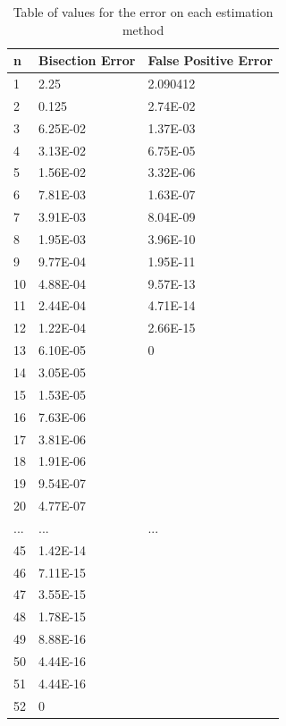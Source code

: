 \documentclass[12pt, letterpaper]{article}
\begin{document}
	\begin{table}[]
		\centering
		\begin{tabular}{|l|l|l|}
			\hline
			n  & Bisection Error & False Positive Error \\ \hline
			1  & 2.25            & 2.090412             \\ \hline
			2  & 0.125           & 2.74E-02             \\ \hline
			3  & 6.25E-02        & 1.37E-03             \\ \hline
			4  & 3.13E-02        & 6.75E-05             \\ \hline
			5  & 1.56E-02        & 3.32E-06             \\ \hline
			6  & 7.81E-03        & 1.63E-07             \\ \hline
			7  & 3.91E-03        & 8.04E-09             \\ \hline
			8  & 1.95E-03        & 3.96E-10             \\ \hline
			9  & 9.77E-04        & 1.95E-11             \\ \hline
			10 & 4.88E-04        & 9.57E-13             \\ \hline
			11 & 2.44E-04        & 4.71E-14             \\ \hline
			12 & 1.22E-04        & 2.66E-15             \\ \hline
			13 & 6.10E-05        & 0                    \\ \hline
			14 & 3.05E-05        &                      \\ \hline
			15 & 1.53E-05        &                      \\ \hline
			16 & 7.63E-06        &                      \\ \hline
			17 & 3.81E-06        &                      \\ \hline
			18 & 1.91E-06        &                      \\ \hline
			19 & 9.54E-07        &                      \\ \hline
			20 & 4.77E-07        &                      \\ \hline
			$...$ & $...$           &   $...$          \\ \hline
			45 & 1.42E-14        &                      \\ \hline
			46 & 7.11E-15        &                      \\ \hline
			47 & 3.55E-15        &                      \\ \hline
			48 & 1.78E-15        &                      \\ \hline
			49 & 8.88E-16        &                      \\ \hline
			50 & 4.44E-16        &                      \\ \hline
			51 & 4.44E-16        &                      \\ \hline
			52 & 0               &                      \\ \hline
		\end{tabular}
		\caption{Table of values for the error on each estimation method}
		\label{err_table}
	\end{table}
	
\end{document}
